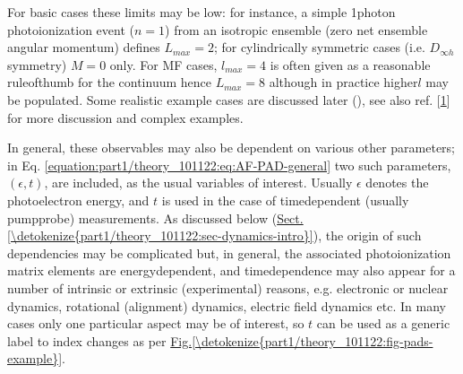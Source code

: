 \documentclass[letterpaper,10pt,english]{jupyterBook}
\begin{document}
\sphinxAtStartPar
For basic cases these limits may be low: for instance, a simple 1\sphinxhyphen{}photon photoionization event (\(n=1\)) from an isotropic ensemble (zero net ensemble angular momentum) defines \(L_{max}=2\); for cylindrically symmetric cases (i.e. \(D_{\infty h}\) symmetry) \(M=0\) only. For MF cases, \(l_{max}=4\) is often given as a reasonable rule\sphinxhyphen{}of\sphinxhyphen{}thumb for the continuum \sphinxhyphen{} hence \(L_{max}=8\) \sphinxhyphen{} although in practice higher\sphinxhyphen{}\(l\) may be populated. Some realistic example cases are discussed later (), see also ref. {[}\hyperlink{cite.backmatter/bibliography:id52}{1}{]} for more discussion and complex examples.

\sphinxAtStartPar
In general, these observables may also be dependent on various other parameters; in Eq. \eqref{equation:part1/theory_101122:eq:AF-PAD-general} two such parameters, \((\epsilon,t)\), are included, as the usual variables of interest. Usually \(\epsilon\) denotes the photoelectron energy, and \(t\) is used in the case of time\sphinxhyphen{}dependent (usually pump\sphinxhyphen{}probe) measurements. As discussed below (\hyperref[\detokenize{part1/theory_101122:sec-dynamics-intro}]{Sect.\@ \ref{\detokenize{part1/theory_101122:sec-dynamics-intro}}}), the origin of such dependencies may be complicated but, in general, the associated photoionization matrix elements are energy\sphinxhyphen{}dependent, and time\sphinxhyphen{}dependence may also appear for a number of intrinsic or extrinsic (experimental) reasons, e.g. electronic or nuclear dynamics, rotational (alignment) dynamics, electric field dynamics etc. In many cases only one particular aspect may be of interest, so \(t\) can be used as a generic label to index changes as per \hyperref[\detokenize{part1/theory_101122:fig-pads-example}]{Fig.\@ \ref{\detokenize{part1/theory_101122:fig-pads-example}}}.
\end{document}
